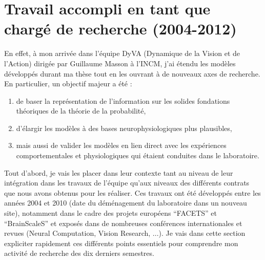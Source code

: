 \documentclass[11pt,french,a4paper,oneside]{article}%
\begin{document}
\section{Travail accompli en tant que chargé de recherche  (2004-2012)}
\label{sec:dyva}%
En effet, à mon arrivée dans l'équipe DyVA (Dynamique de la Vision et de l'Action) dirigée par Guillaume Masson à l'INCM, j'ai étendu les modèles développés durant ma thèse tout en les ouvrant à de nouveaux axes de recherche. En particulier, un objectif majeur a été :
\begin{enumerate} \item de baser la représentation de l'information sur les solides fondations théoriques de la théorie de la probabilité, \item d'élargir les modèles à des bases neurophysiologiques plus plausibles, \item mais aussi de valider les modèles en lien direct avec les expériences comportementales et physiologiques qui étaient conduites dans le laboratoire. \end{enumerate} %
Tout d'abord, je vais les placer dans leur contexte tant au niveau de leur intégration dans les travaux de l'équipe qu'aux niveaux des différents contrats que nous avons obtenus pour les réaliser. Ces travaux ont été développés entre les années 2004 et 2010 (date du déménagement du laboratoire dans un nouveau site), notamment dans le cadre des projets européens ``FACETS'' et ``BrainScaleS'' et exposés dans de nombreuses conférences internationales et revues (Neural Computation, Vision Research, ...). Je vais dans cette section expliciter rapidement ces différents points essentiels pour comprendre mon activité de recherche des dix derniers semestres. %
\end{document}
